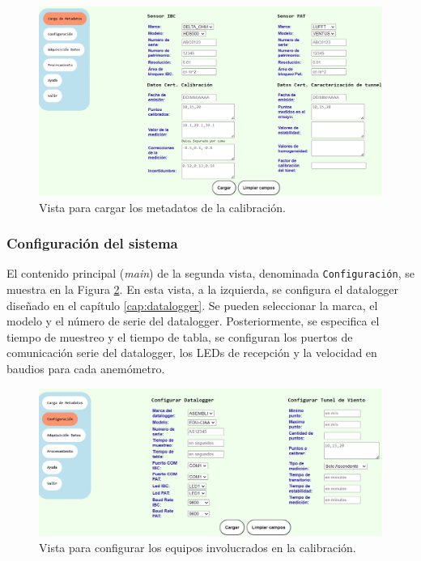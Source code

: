 \begin{figure}[H]
    \centering
    \includegraphics[width=1\linewidth]{Figuras/AplicacionWeb/frondend/cargaMetadata.png}
    \caption{Vista para cargar los metadatos de la calibración.}
    \label{fig:cargaMetadata}
\end{figure}

\subsubsection{Configuración del sistema}\label{sec:configSistema}

El contenido principal (\textit{main}) de la segunda vista, denominada \texttt{Configuración}, se muestra en la Figura \ref{fig:configEquipos}. En esta vista, a la izquierda, se configura el datalogger diseñado en el capítulo \ref{cap:datalogger}. Se pueden seleccionar la marca, el modelo y el número de serie del datalogger. Posteriormente, se especifica el tiempo de muestreo y el tiempo de tabla, se configuran los puertos de comunicación serie del datalogger, los LEDs de recepción y la velocidad en baudios para cada anemómetro.

\begin{figure}[H]
    \centering
    \includegraphics[width=1\linewidth]{Figuras/AplicacionWeb/frondend/configEquipos.png}
    \caption{Vista para configurar los equipos involucrados en la calibración.}
    \label{fig:configEquipos}
\end{figure}

